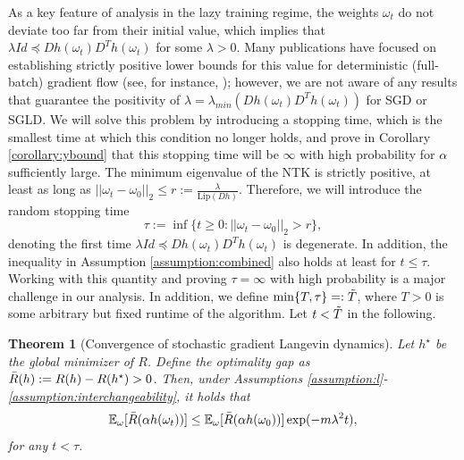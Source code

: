 \documentclass[10pt]{article} %
\newcommand{\bE}{\mathbb{E}}
\newtheorem{theorem}{Theorem}
\begin{document}
As a key feature of analysis in the lazy training regime, the weights $\omega_t$ do not deviate too far from their initial value, which implies that $\lambda Id\preceq Dh(\omega_t)D^Th(\omega_t)$ for some $\lambda > 0$. Many publications have focused on establishing strictly positive lower bounds for this value for deterministic (full-batch) gradient flow (see, for instance, \cite{du2018gradient, ChizatBachlazyTraining}); however, we are not aware of any results that guarantee the positivity of $\lambda=\lambda_{min}(Dh(\omega_t)D^Th(\omega_t))$ for SGD or SGLD. We will solve this problem by introducing a stopping time, which is the smallest time at which this condition no longer holds, and prove in Corollary \ref{corollary:ybound} that this stopping time will be $\infty$ with high probability for $\alpha$ sufficiently large. The minimum eigenvalue of the NTK is strictly positive, at least as long as $||\omega_t-\omega_0||_2\leq r:=\frac{\lambda}{\mathrm{Lip}(Dh)}$. Therefore, we will introduce the random stopping time
$$\tau:=\inf\{t\geq 0:||\omega_t-\omega_0||_2> r\},$$
denoting the first time $\lambda Id \preceq Dh(\omega_t)D^Th(\omega_t)$ is degenerate. In addition, the inequality in Assumption \ref{assumption:combined} also holds at least for $t\leq \tau$. Working with this quantity and proving $\tau=\infty$ with high probability is a major challenge in our analysis. In addition, we define $\min\{T,\tau\}=:\Tilde{T}$, where $T>0$ is some arbitrary but fixed runtime of the algorithm. Let $t<\Tilde{T}$ in the following.
\begin{theorem}[Convergence of stochastic gradient Langevin dynamics]\label{th:ybound}
    Let $h^\star$ be the global minimizer of $R$. Define the optimality gap as $\Bar{R}(h):=R(h)-R(h^\star)>0$. Then, under Assumptions \ref{assumption:l}-\ref{assumption:interchangeability}, it holds that 
    \begin{equation}\label{eq:ybound}
        \bE_\omega[\Bar{R}(\alpha h(\omega_t))]\leq \bE_\omega[\Bar{R}(\alpha h(\omega_0))]\exp(-m\lambda^2 t),
    \end{equation}
    for any $t < \tau$.
\end{theorem}
\end{document}
